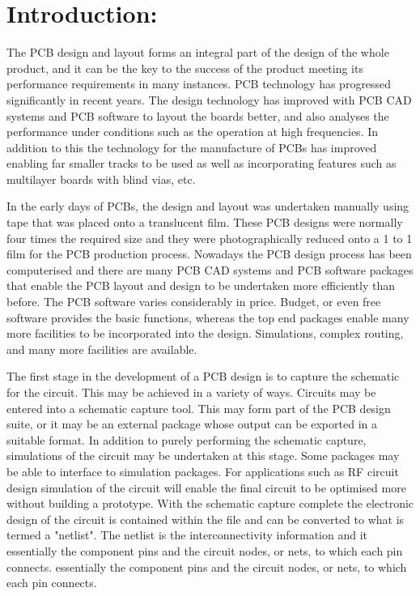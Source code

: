 \section{Introduction:}

The PCB design and layout forms an integral part of the design of the whole product, and it can be the key to the success of the product meeting its performance requirements in many instances. PCB technology has progressed significantly in recent years. The design technology has improved with PCB CAD systems and PCB software to layout the boards better, and also analyses the performance under conditions such as the operation at high frequencies. In addition to this the technology for the manufacture of PCBs has improved enabling far smaller tracks to be used as well as incorporating features such as multilayer boards with blind vias, etc. \hfill \break

In the early days of PCBs, the design and layout was undertaken manually using tape that was placed onto a translucent film. These PCB designs were normally four times the required size and they were photographically reduced onto a 1 to 1 film for the PCB production process. Nowadays the PCB design process has been computerised and there are many PCB CAD systems and PCB software packages that enable the PCB layout and design to be undertaken more efficiently than before. The PCB software varies considerably in price. Budget, or even free software provides the basic functions, whereas the top end packages enable many more facilities to be incorporated into the design. Simulations, complex routing, and many more facilities are available. \hfill \break

The first stage in the development of a PCB design is to capture the schematic for the circuit. This may be achieved in a variety of ways. Circuits may be entered into a schematic capture tool. This may form part of the PCB design suite, or it may be an external package whose output can be exported in a suitable format. In addition to purely performing the schematic capture, simulations of the circuit may be undertaken at this stage. Some packages may be able to interface to simulation packages. For applications such as RF circuit design simulation of the circuit will enable the final circuit to be optimised more without building a prototype. With the schematic capture complete the electronic design of the circuit is contained within the file and can be converted to what is termed a "netlist". The netlist is the interconnectivity information and it essentially the component pins and the circuit nodes, or nets, to which
each pin connects. essentially the component pins and the circuit nodes, or nets, to which each pin connects. \hfill \break 

